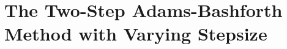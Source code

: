 \chapter[The Two-Step Adams-Bashforth Method]
  {The Two-Step Adams-Bashforth\\ Method with Varying Stepsize}
  \label{apx:ab_method}